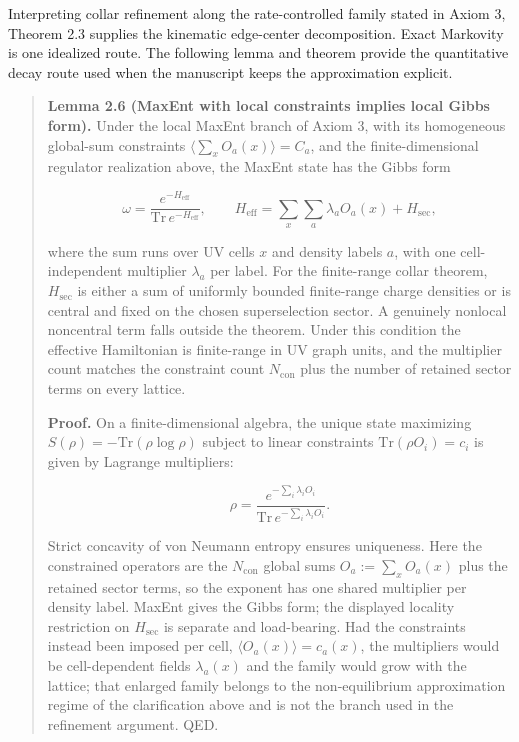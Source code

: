 Interpreting collar refinement along the rate-controlled family stated in Axiom 3, Theorem 2.3 supplies the kinematic edge-center decomposition. Exact Markovity is one idealized route. The following lemma and theorem provide the quantitative decay route used when the manuscript keeps the approximation explicit.

\begin{quote}
\textbf{Lemma 2.6 (MaxEnt with local constraints implies local Gibbs form).} Under the local MaxEnt branch of Axiom 3, with its homogeneous global-sum constraints \(\langle\sum_x O_a(x)\rangle = C_a\), and the finite-dimensional regulator realization above, the MaxEnt state has the Gibbs form

\[
\omega = \frac{e^{-H_{\mathrm{eff}}}}{\mathrm{Tr}\,e^{-H_{\mathrm{eff}}}},
\qquad
H_{\mathrm{eff}} = \sum_x \sum_a \lambda_a O_a(x) + H_{\mathrm{sec}},
\]

where the sum runs over UV cells \(x\) and density labels \(a\), with one cell-independent multiplier \(\lambda_a\) per label. For the finite-range collar theorem, \(H_{\mathrm{sec}}\) is either a sum of uniformly bounded finite-range charge densities or is central and fixed on the chosen superselection sector. A genuinely nonlocal noncentral term falls outside the theorem. Under this condition the effective Hamiltonian is finite-range in UV graph units, and the multiplier count matches the constraint count \(N_{\mathrm{con}}\) plus the number of retained sector terms on every lattice.

\textbf{Proof.} On a finite-dimensional algebra, the unique state maximizing \(S(\rho) = -\mathrm{Tr}(\rho \log \rho)\) subject to linear constraints \(\mathrm{Tr}(\rho O_i) = c_i\) is given by Lagrange multipliers:

\[
\rho = \frac{e^{-\sum_i \lambda_i O_i}}{\mathrm{Tr}\,e^{-\sum_i \lambda_i O_i}}.
\]

Strict concavity of von Neumann entropy ensures uniqueness. Here the constrained operators are the \(N_{\mathrm{con}}\) global sums \(O_a := \sum_x O_a(x)\) plus the retained sector terms, so the exponent has one shared multiplier per density label. MaxEnt gives the Gibbs form; the displayed locality restriction on \(H_{\mathrm{sec}}\) is separate and load-bearing. Had the constraints instead been imposed per cell, \(\langle O_a(x)\rangle = c_a(x)\), the multipliers would be cell-dependent fields \(\lambda_a(x)\) and the family would grow with the lattice; that enlarged family belongs to the non-equilibrium approximation regime of the clarification above and is not the branch used in the refinement argument. QED.
\end{quote}

